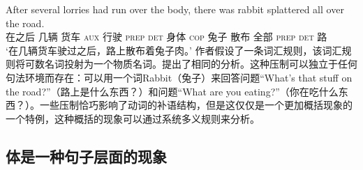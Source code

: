 \ea
\gll After several lorries had run over the body, there was rabbit splattered all over the road.\\
     在之后 几辆 货车 \textsc{aux} 行驶 \textsc{prep} \textsc{det} 身体 \expl{} \textsc{cop} 兔子 散布 全部 \textsc{prep} \textsc{det} 路\\
\glt `在几辆货车驶过之后，路上散布着兔子肉。'
\z
作者假设了一条词汇规则，该词汇规则将可数名词投射为一个物质名词。\citet[--115]{Fillmore99a}提出了相同的分析。这种压制可以独立于任何句法环境而存在：可以用一个词Rabbit（兔子）来回答问题“What's that stuff on the road?”（路上是什么东西？）和问题“What are you eating?”（你在吃什么东西？）。一些压制恰巧影响了动词的补语结构，但是这仅仅是一个更加概括现象的一个特例，这种概括的现象可以通过系统多义规则来分析。

\subsection{体是一种句子层面的现象}
\label{sec-aspect-at-clause-level}


